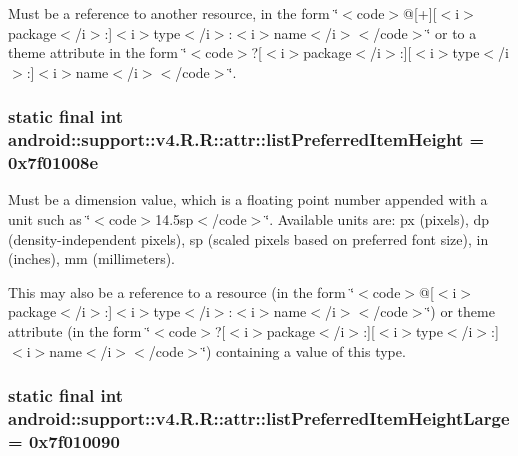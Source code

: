 Must be a reference to another resource, in the form \char`\"{}$<$code$>$@\mbox{[}+\mbox{]}\mbox{[}$<$i$>$package$<$/i$>$:\mbox{]}$<$i$>$type$<$/i$>$:$<$i$>$name$<$/i$>$$<$/code$>$\char`\"{} or to a theme attribute in the form \char`\"{}$<$code$>$?\mbox{[}$<$i$>$package$<$/i$>$:\mbox{]}\mbox{[}$<$i$>$type$<$/i$>$:\mbox{]}$<$i$>$name$<$/i$>$$<$/code$>$\char`\"{}. \hypertarget{classandroid_1_1support_1_1v4_1_1_r_1_1attr_8a3d97af7b98d46125035b9f7912c45f}{
\subsubsection[{listPreferredItemHeight}]{\setlength{\rightskip}{0pt plus 5cm}static final int android::support::v4.R.R::attr::listPreferredItemHeight = 0x7f01008e}}
\label{classandroid_1_1support_1_1v4_1_1_r_1_1attr_8a3d97af7b98d46125035b9f7912c45f}


Must be a dimension value, which is a floating point number appended with a unit such as \char`\"{}$<$code$>$14.5sp$<$/code$>$\char`\"{}. Available units are: px (pixels), dp (density-independent pixels), sp (scaled pixels based on preferred font size), in (inches), mm (millimeters). 

This may also be a reference to a resource (in the form \char`\"{}$<$code$>$@\mbox{[}$<$i$>$package$<$/i$>$:\mbox{]}$<$i$>$type$<$/i$>$:$<$i$>$name$<$/i$>$$<$/code$>$\char`\"{}) or theme attribute (in the form \char`\"{}$<$code$>$?\mbox{[}$<$i$>$package$<$/i$>$:\mbox{]}\mbox{[}$<$i$>$type$<$/i$>$:\mbox{]}$<$i$>$name$<$/i$>$$<$/code$>$\char`\"{}) containing a value of this type. \hypertarget{classandroid_1_1support_1_1v4_1_1_r_1_1attr_c43eb20d693666641f44ee104f48ae04}{
\subsubsection[{listPreferredItemHeightLarge}]{\setlength{\rightskip}{0pt plus 5cm}static final int android::support::v4.R.R::attr::listPreferredItemHeightLarge = 0x7f010090}}
\label{classandroid_1_1support_1_1v4_1_1_r_1_1attr_c43eb20d693666641f44ee104f48ae04}


